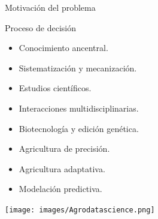 \documentclass[aspectratio=169]{beamer}
\begin{document}
\begin{frame}{Motivación del problema}
	\begin{block}{\centering Proceso de decisión}
		\begin{minipage}{0.5\textwidth}
			\begin{itemize}
				\item Conocimiento ancentral.
				\item Sistematización y mecanización.
				\item Estudios científicos.
				\item Interacciones multidisciplinarias.
			\end{itemize}
		\end{minipage}%
		\begin{minipage}{0.5\textwidth}
			\begin{itemize}
				\item Biotecnología y edición genética.
				\item Agricultura de precisión.
				\item Agricultura adaptativa.
				\item Modelación predictiva.
			\end{itemize}
		\end{minipage}
	\end{block}
	\centering\texttt{[image: images/Agrodatascience.png]}
\end{frame}
\end{document}
